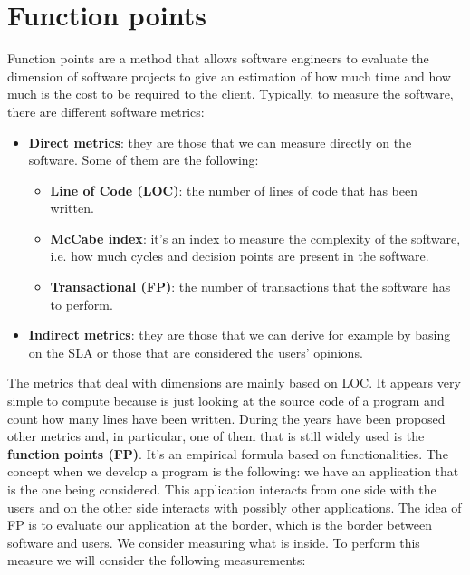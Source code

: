 \section{Function points}
Function points are a method that allows software engineers to evaluate the dimension of software projects to give an estimation of how much time and how much is the cost to be required to the client.
Typically, to measure the software, there are different software metrics:
\begin{itemize}
    \item \textbf{Direct metrics}: they are those that we can measure directly on the software. Some of them are the following:
          \begin{itemize}
              \item \textbf{Line of Code (LOC)}: the number of lines of code that has been written.
              \item \textbf{McCabe index}: it's an index to measure the complexity of the software, i.e. how much cycles and decision points are present in the software.
              \item \textbf{Transactional (FP)}: the number of transactions that the software has to perform.
          \end{itemize}
    \item \textbf{Indirect metrics}: they are those that we can derive for example by basing on the SLA or those that are considered the users' opinions.
\end{itemize}
The metrics that deal with dimensions are mainly based on LOC.
It appears very simple to compute because is just looking at the source code of a program and count how many lines have been written.
During the years have been proposed other metrics and, in particular, one of them that is still widely used is the \textbf{function points (FP)}.
It's an empirical formula based on functionalities.
The concept when we develop a program is the following: we have an application that is the one being considered. This application interacts from one side with the users and on the other side interacts with possibly other applications.
The idea of FP is to evaluate our application at the border, which is the border between software and users. We consider measuring what is inside.
To perform this measure we will consider the following measurements:
